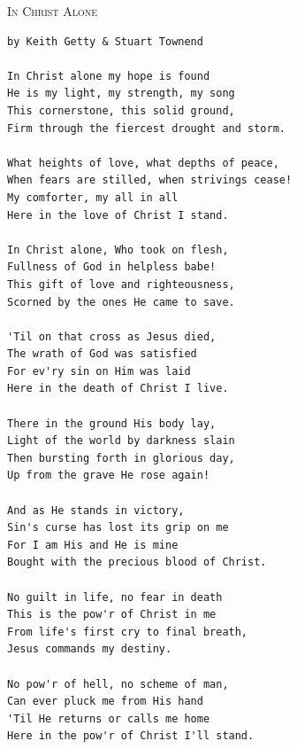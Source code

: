 \documentclass[10pt,oneside,footinclude=true,headinclude=true]{scrbook} %
\newcommand\songtitle[1]{
	\hspace*{-3.7mm}\Large\textsc{#1}
}
\begin{document}
\bigskip
\medskip
\songtitle{In Christ Alone}
\begin{verbatim}
by Keith Getty & Stuart Townend

In Christ alone my hope is found
He is my light, my strength, my song
This cornerstone, this solid ground,
Firm through the fiercest drought and storm.

What heights of love, what depths of peace,
When fears are stilled, when strivings cease!
My comforter, my all in all
Here in the love of Christ I stand.

In Christ alone, Who took on flesh,
Fullness of God in helpless babe!
This gift of love and righteousness,
Scorned by the ones He came to save.

'Til on that cross as Jesus died,
The wrath of God was satisfied
For ev'ry sin on Him was laid
Here in the death of Christ I live.

There in the ground His body lay,
Light of the world by darkness slain
Then bursting forth in glorious day,
Up from the grave He rose again!

And as He stands in victory,
Sin's curse has lost its grip on me
For I am His and He is mine
Bought with the precious blood of Christ.

No guilt in life, no fear in death
This is the pow'r of Christ in me
From life's first cry to final breath,
Jesus commands my destiny.

No pow'r of hell, no scheme of man,
Can ever pluck me from His hand
'Til He returns or calls me home
Here in the pow'r of Christ I'll stand.
\end{verbatim}

\end{document}
